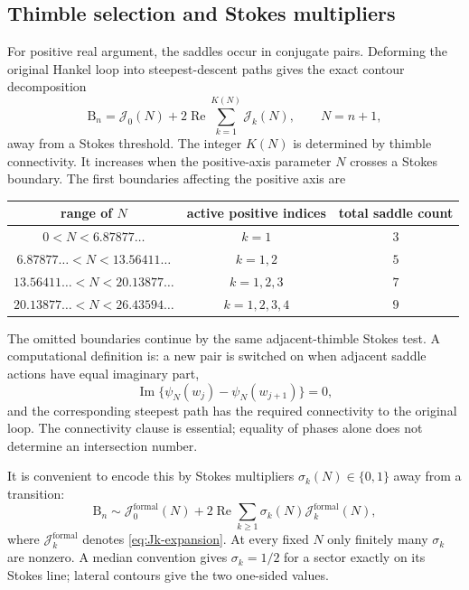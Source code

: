 \documentclass[11pt,a4paper]{article}
\theoremstyle{definition}
\newcommand{\Bell}{\mathrm B}
\newcommand{\cJ}{\mathcal J}
\DeclareMathOperator{\RePart}{Re}
\DeclareMathOperator{\ImPart}{Im}
\begin{document}
\subsection{Thimble selection and Stokes multipliers}

For positive real argument, the saddles occur in conjugate pairs.  Deforming
the original Hankel loop into steepest-descent paths gives the exact contour
decomposition
\begin{equation}\label{eq:exact-thimble-decomp}
 \Bell_n=\cJ_0(N)+2\RePart\sum_{k=1}^{K(N)}\cJ_k(N),
 \qquad N=n+1,
\end{equation}
away from a Stokes threshold.  The integer $K(N)$ is determined by thimble
connectivity.  It increases when the positive-axis parameter $N$ crosses a
Stokes boundary.  The first boundaries affecting the positive axis are
\begin{center}
\begin{tabular}{@{}ccc@{}}
\toprule
range of $N$ & active positive indices & total saddle count\\
\midrule
$0<N<6.87877\ldots$ & $k=1$ & $3$\\
$6.87877\ldots<N<13.56411\ldots$ & $k=1,2$ & $5$\\
$13.56411\ldots<N<20.13877\ldots$ & $k=1,2,3$ & $7$\\
$20.13877\ldots<N<26.43594\ldots$ & $k=1,2,3,4$ & $9$\\
\bottomrule
\end{tabular}
\end{center}
The omitted boundaries continue by the same adjacent-thimble Stokes test.  A
computational definition is: a new pair is switched on when adjacent saddle
actions have equal imaginary part,
\begin{equation}\label{eq:stokes-condition}
 \ImPart\{\psi_N(w_j)-\psi_N(w_{j+1})\}=0,
\end{equation}
and the corresponding steepest path has the required connectivity to the
original loop.  The connectivity clause is essential; equality of phases
alone does not determine an intersection number.

It is convenient to encode this by Stokes multipliers
$\sigma_k(N)\in\{0,1\}$ away from a transition:
\begin{equation}\label{eq:formal-full-transseries}
 \boxed{
 \Bell_n\sim
 \cJ_0^{\mathrm{formal}}(N)
 +2\RePart\sum_{k\ge1}\sigma_k(N)
 \cJ_k^{\mathrm{formal}}(N),}
\end{equation}
where $\cJ_k^{\mathrm{formal}}$ denotes \eqref{eq:Jk-expansion}.  At every
fixed $N$ only finitely many $\sigma_k$ are nonzero.  A median convention gives
$\sigma_k=1/2$ for a sector exactly on its Stokes line; lateral contours give
the two one-sided values.
\end{document}
